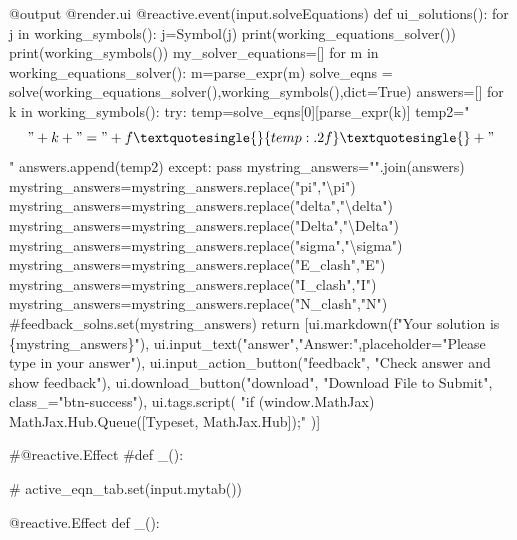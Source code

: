 \documentclass[
  letterpaper,
  DIV=11,
  numbers=noendperiod]{scrreprt}
\newenvironment{Shaded}{\begin{snugshade}}{\end{snugshade}}
\newcommand{\NormalTok}[1]{\textcolor[rgb]{0.00,0.23,0.31}{#1}}
\begin{document}
\begin{Shaded}
\begin{Highlighting}[]
\NormalTok{    @output}
\NormalTok{    @render.ui}
\NormalTok{    @reactive.event(input.solveEquations)}
\NormalTok{    def ui\_solutions():}
\NormalTok{        for j in working\_symbols():}
\NormalTok{            j=Symbol(j)}
\NormalTok{        print(working\_equations\_solver())}
\NormalTok{        print(working\_symbols())}
\NormalTok{        my\_solver\_equations=[]}
\NormalTok{        for m in working\_equations\_solver():}
\NormalTok{            m=parse\_expr(m)}
\NormalTok{        solve\_eqns = solve(working\_equations\_solver(),working\_symbols(),dict=True)}
\NormalTok{        answers=[]}
\NormalTok{        for k in working\_symbols():}
\NormalTok{            try: }
\NormalTok{                temp=solve\_eqns[0][parse\_expr(k)]}
\NormalTok{                temp2="$$"+k+"="+f\textquotesingle{}\{temp:.2f\}\textquotesingle{}+"$$"}
\NormalTok{                answers.append(temp2)}
\NormalTok{            except:}
\NormalTok{                pass}
\NormalTok{        mystring\_answers="".join(answers)}
\NormalTok{        mystring\_answers=mystring\_answers.replace("pi","\textbackslash{}pi")}
\NormalTok{        mystring\_answers=mystring\_answers.replace("delta","\textbackslash{}delta")}
\NormalTok{        mystring\_answers=mystring\_answers.replace("Delta","\textbackslash{}Delta")}
\NormalTok{        mystring\_answers=mystring\_answers.replace("sigma","\textbackslash{}sigma")}
\NormalTok{        mystring\_answers=mystring\_answers.replace("E\_clash","E")}
\NormalTok{        mystring\_answers=mystring\_answers.replace("I\_clash","I")}
\NormalTok{        mystring\_answers=mystring\_answers.replace("N\_clash","N")}
\NormalTok{        \#feedback\_solns.set(mystring\_answers)}
\NormalTok{        return [ui.markdown(f"Your solution is \{mystring\_answers\}"),}
\NormalTok{                ui.input\_text("answer","Answer:",placeholder="Please type in your answer"),}
\NormalTok{                ui.input\_action\_button("feedback", "Check answer and show feedback"),}
\NormalTok{                ui.download\_button("download", "Download File to Submit", class\_="btn{-}success"),}
\NormalTok{                ui.tags.script(}
\NormalTok{                "if (window.MathJax) MathJax.Hub.Queue([\textquotesingle{}Typeset\textquotesingle{}, MathJax.Hub]);"}
\NormalTok{                )]}

\NormalTok{    \#@reactive.Effect}
\NormalTok{    \#def \_():}

\NormalTok{     \#   active\_eqn\_tab.set(input.mytab())}
    
    
\NormalTok{    @reactive.Effect}
\NormalTok{    def \_():}


\end{Highlighting}
\end{Shaded}
\end{document}
